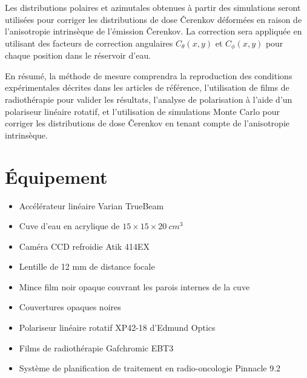 \documentclass{Thesis}
\begin{document}
Les distributions polaires et azimutales obtenues à partir des simulations seront utilisées pour corriger les distributions de dose Čerenkov déformées en raison de l'anisotropie intrinsèque de l'émission Čerenkov.
La correction sera appliquée en utilisant des facteurs de correction angulaires $C_{\theta}(x, y)$ et $C_{\phi}(x, y)$ pour chaque position dans le réservoir d'eau.

En résumé, la méthode de mesure comprendra la reproduction des conditions expérimentales décrites dans les articles de référence, l'utilisation de films de radiothérapie pour valider les résultats, l'analyse de polarisation à l'aide d'un polariseur linéaire rotatif, et l'utilisation de simulations Monte Carlo pour corriger les distributions de dose Čerenkov en tenant compte de l'anisotropie intrinsèque.

\section*{Équipement}
\begin{multicols}{2}
\begin{itemize}
    \setlength\itemsep{1mm}
    \item Accélérateur linéaire Varian TrueBeam
    \item Cuve d'eau en acrylique de $15 \times 15 \times \SI{20}{cm^3}$
    \item Caméra CCD refroidie Atik 414EX
    \item Lentille de 12 mm de distance focale
    \item Mince film noir opaque couvrant les parois internes de la cuve
    \item Couvertures opaques noires
    \item Polariseur linéaire rotatif XP42-18 d'Edmund Optics
    \item Films de radiothérapie Gafchromic EBT3
    \item Système de planification de traitement en radio-oncologie Pinnacle 9.2
\end{itemize}
\end{multicols}

\newpage
\printbibliography
\end{document}
